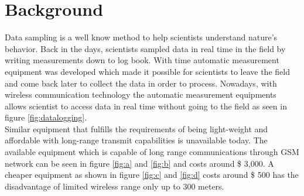 \section{Background}
Data sampling is a well know method to help scientists understand nature's behavior. Back in the days, scientists sampled data in real time in the field by writing measurements down to log book. With time automatic measurement equipment was developed which made it possible for scientists to leave the field and come back later to collect the data in order to process. Nowadays, with wireless communication technology the automatic measurement equipments allows scientist to access data in real time without going to the field as seen in figure \ref{fig:datalogging}.\\
Similar equipment that fulfills the requirements of being light-weight and affordable with long-range transmit capabilities is unavailable today. The available equipment which is capable of long range communications through GSM network can be seen in figure \ref{fig:a} and \ref{fig:b} and costs around \$ 3,000. A cheaper equipment as shown in figure \ref{fig:c} and  \ref{fig:d} costs around \$ 500 has the disadvantage of limited wireless range only up to 300 meters.

